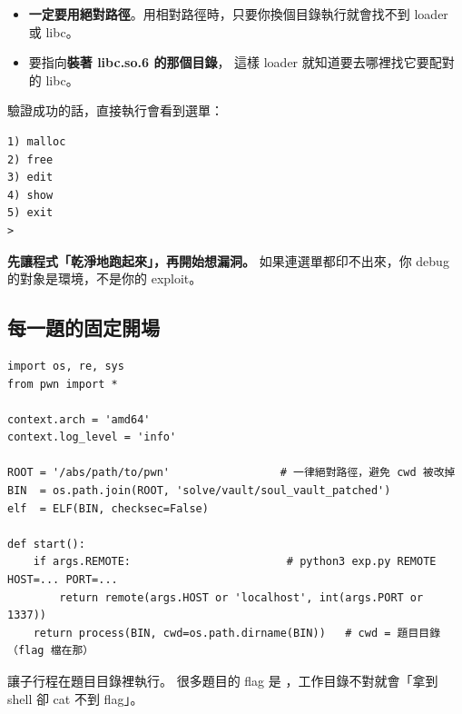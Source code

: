 \begin{warnbox}[兩個小細節]
\begin{itemize}[leftmargin=1.4em,itemsep=1pt]
  \item \textbf{一定要用絕對路徑}。用相對路徑時，只要你換個目錄執行就會找不到 loader 或 libc。
  \item {} 要指向\textbf{裝著 libc.so.6 的那個目錄}，
        這樣 loader 就知道要去哪裡找它要配對的 libc。
\end{itemize}
\end{warnbox}

驗證成功的話，直接執行會看到選單：

\begin{lstlisting}[style=raw]
1) malloc
2) free
3) edit
4) show
5) exit
>
\end{lstlisting}

\begin{keybox}[一句話心法]
\textbf{先讓程式「乾淨地跑起來」，再開始想漏洞。}
如果連選單都印不出來，你 debug 的對象是環境，不是你的 exploit。
\end{keybox}

\subsection{每一題的固定開場}

\begin{lstlisting}[style=py]
import os, re, sys
from pwn import *

context.arch = 'amd64'
context.log_level = 'info'

ROOT = '/abs/path/to/pwn'                 # 一律絕對路徑，避免 cwd 被改掉
BIN  = os.path.join(ROOT, 'solve/vault/soul_vault_patched')
elf  = ELF(BIN, checksec=False)

def start():
    if args.REMOTE:                        # python3 exp.py REMOTE HOST=... PORT=...
        return remote(args.HOST or 'localhost', int(args.PORT or 1337))
    return process(BIN, cwd=os.path.dirname(BIN))   # cwd = 題目目錄（flag 檔在那）
\end{lstlisting}

\begin{keybox}
 讓子行程在題目目錄裡執行。
很多題目的 flag 是 ，工作目錄不對就會「拿到 shell 卻 cat 不到 flag」。
\end{keybox}
